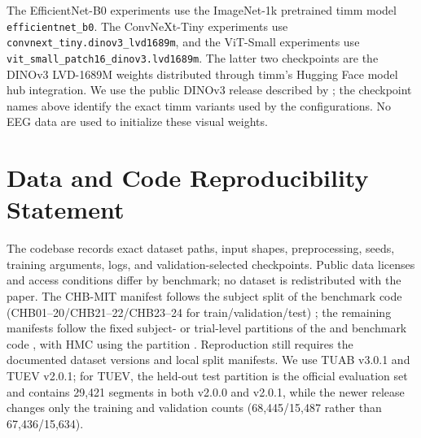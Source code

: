 The EfficientNet-B0 experiments use the ImageNet-1k pretrained timm model
\texttt{efficientnet\_b0}. The ConvNeXt-Tiny experiments use
\texttt{convnext\_tiny.dinov3\_lvd1689m}, and the ViT-Small experiments use
\texttt{vit\_small\_patch16\_dinov3.lvd1689m}. The latter two checkpoints are
the DINOv3 LVD-1689M weights distributed through timm's Hugging Face model
hub integration. We use the public DINOv3 release described by
\citet{oquab2025dinov3}; the checkpoint names above identify the exact timm
variants used by the configurations. No EEG data are used to initialize these
visual weights.

\section{Data and Code Reproducibility Statement}

The codebase records exact dataset paths, input shapes, preprocessing, seeds,
training arguments, logs, and validation-selected checkpoints.  Public data
licenses and access conditions differ by benchmark; no dataset is redistributed
with the paper.  The CHB-MIT manifest follows the subject split of the
\cbramod{} benchmark code (CHB01--20/CHB21--22/CHB23--24 for
train/validation/test) \citep{wang2025cbramod}; the remaining manifests follow
the fixed subject- or trial-level partitions of the \cbramod{} and \reve{}
benchmark code \citep{wang2025cbramod,elouahidi2025reve}, with HMC using the
\reve{} partition \citep{elouahidi2025reve,alvarez2022hmc}.  Reproduction still
requires the documented dataset versions and local split manifests. We use
TUAB v3.0.1 and TUEV v2.0.1; for TUEV, the held-out test partition is the
official evaluation set and contains 29,421 segments in both v2.0.0 and
v2.0.1, while the newer release changes only the training and validation
counts (68,445/15,487 rather than 67,436/15,634).

